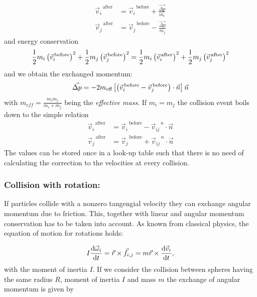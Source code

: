 \begin{align}
{\vec{v}_i}^{\,\text{after}} &= {\vec{v}_{i}}^{\,\text{before}} + \frac{\vec{\Delta p}}{m_i} \\
{\vec{v}_j}^{\,\text{after}} &= {\vec{v}_{j}}^{\,\text{before}} - \frac{\vec{\Delta p}}{m_j}
\end{align}
and energy conservation
\begin{equation}
\frac{1}{2}m_i \left(\vec{v}_i^{\,\text{before}}\right)^2 + \frac{1}{2}m_j \left(\vec{v}_j^{\,\text{before}}\right)^2 
=
\frac{1}{2}m_i \left(\vec{v}_i^{\,\text{after}}\right)^2 + \frac{1}{2}m_j \left(\vec{v}_j^{\,\text{after}}\right)^2 
\end{equation}
and we obtain the exchanged momentum: 
\begin{equation}
\vec{\Delta p} = -2 m_{\text{eff}} \left[\left(\vec{v}_i^{\,\text{before}}-\vec{v}_j^{\,\text{before}}\right)\cdot\vec{n}\right]\vec{n}
\end{equation}
with $m_{eff}=\frac{m_i m_j}{m_i+m_j}$ being the \emph{effective mass}. If $m_i=m_j$ the collision event boils down to the simple relation
\begin{align}
{\vec{v}_i}^{\,\text{after}} &= {\vec{v}_{i}}^{\,\text{before}} - {\vec{v}_{ij}}^{\,n}\cdot\vec{n} \\
{\vec{v}_j}^{\,\text{after}} &= {\vec{v}_{j}}^{\,\text{before}} + {\vec{v}_{ij}}^{\,n}\cdot\vec{n}
\end{align}
The values can be stored once in a look-up table such that there is no need of calculating the correction to the velocities at every collision.








\subsubsection*{Collision with rotation:}

If particles collide with a nonzero tangengial velocity they can exchange angular momentum due to friction. This, together with linear and angular momentum conservation has to be taken into account. As known from classical physics, the equation of motion for rotations holds:


\begin{equation}
I\frac{\text{d} \vec{\omega}_i}{\text{d} t} = \vec{r}\times\vec{f}_{i,j} = m\vec{r}\times\frac{\text{d} \vec{v}_i}{\text{d} t},
\end{equation}
with the moment of inertia $I$. If we consider the collision between spheres having the same radius $R$, moment of inertia $I$ and mass $m$ the exchange of angular momentum is given by

